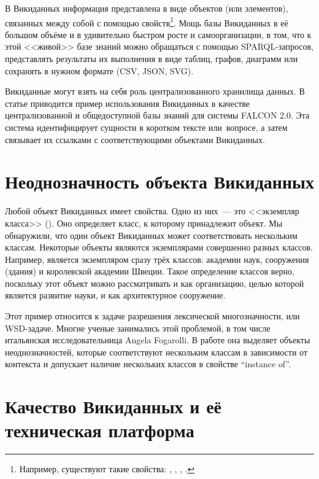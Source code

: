 В Викиданных информация представлена в виде объектов (или элементов), 
связанных между собой с помощью свойств\footnote{%
%
Например, существуют такие свойства: , 
, \mbox{}, .%
%
}. Мощь базы Викиданных в её большом объёме и в удивительно быстром росте и самоорганизации, 
в том, что к этой <<живой>> базе знаний можно обращаться с помощью  SPARQL-запросов, 
представлять результаты их выполнения в виде таблиц, графов, диаграмм или сохранять в нужном формате (CSV, JSON, SVG).

Викиданные могут взять на себя роль централизованного хранилища данных. В статье\autocite{Falcon_2.0} приводится пример использования Викиданных в качестве централизованной и общедоступной базы знаний для системы FALCON 2.0. Эта система идентифицирует сущности в коротком тексте или~вопросе, а затем связывает их ссылками с соответствующими объектами Викиданных.



\section{Неоднозначность объекта Викиданных}

Любой объект Викиданных имеет свойства. Одно из них~--- это <<экземпляр класса>> 
(). Оно определяет класс, к которому принадлежит объект. 
Мы обнаружили, что один объект Викиданных может соответствовать нескольким классам.
Некоторые объекты являются экземплярами совершенно разных классов. 
Например,  является экземпляром 
сразу трёх классов: академии наук, сооружения (здания) и королевской академии Швеции. 
Такое определение классов верно, поскольку этот объект можно рассматривать 
и как организацию, целью которой является развитие науки, и как архитектурное сооружение. 

Этот пример относится к задаче разрешения лексической многозначности, или WSD-задаче. 
Многие ученые занимались этой проблемой, 
в том числе итальянская исследовательница Angela Fogarolli. 
В работе\autocite{Fogarolli} она выделяет объекты неоднозначностей, 
которые соответствуют нескольким классам в зависимости от контекста 
и допускает наличие нескольких классов в свойстве ``instance of''.



\section{Качество Викиданных и её техническая платформа}

